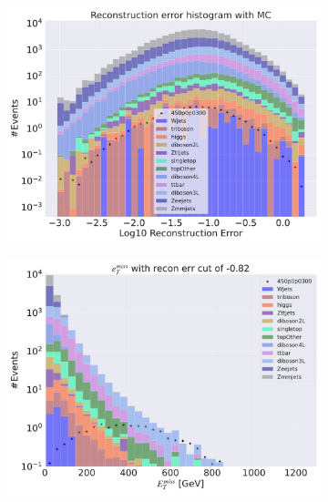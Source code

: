 \begin{figure}[H]
    \centering
    \begin{subfigure}{.40\textwidth}
        \includegraphics[width=\textwidth]{Figures/VAE_testing/big/3lep/b_data_recon_big_rm3_feats_sig_450p0p0300.pdf}
        \caption{ }
        \label{fig:VAE_3lep_big_450_2}
    \end{subfigure}
    \hfill
    \begin{subfigure}{.40\textwidth}
        \includegraphics[width=\textwidth]{Figures/VAE_testing/big/3lep/b_data_recon_big_rm3_feats_sig_450p0p0300_etmiss_recon_errcut_-0.82.pdf}
        \caption{}
        \label{fig:VAE_3lep_big_etmiss_450_2}
    \end{subfigure}

\end{figure}
